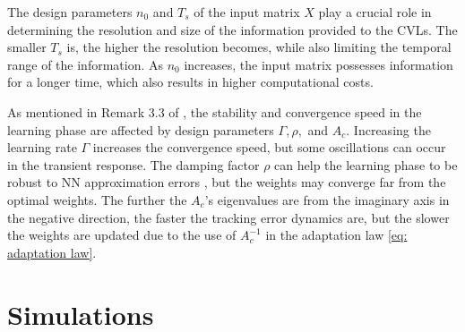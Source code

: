 \documentclass[letterpaper, 10 pt, conference]{ieeeconf}  %
\begin{document}
\begin{remark}
The design parameters $n_0$ and $T_s$ of the input matrix $X$ play a crucial role in determining the resolution and size of the information provided to the CVLs. The smaller $T_s$ is, the higher the resolution becomes, while also limiting the temporal range of the information.
As $n_0$ increases, the input matrix possesses information for a longer time, which also results in higher computational costs.
\label{remark:stack param}
\end{remark}

\begin{remark}
As mentioned in Remark 3.3 of \cite{BookEKcontrol}, the stability and convergence speed in the learning phase are affected by design parameters $\Gamma, \rho,$ and $A_c$. 
Increasing the learning rate $\Gamma$ increases the convergence speed, but some oscillations can occur in the transient response. 
The damping factor $\rho$ can help the learning phase to be robust to NN approximation errors \cite{BookSSGe}, but the weights may converge far from the optimal weights. 
The further the $A_c$'s eigenvalues are from the imaginary axis in the negative direction, the faster the tracking error dynamics are, but the slower the weights are updated due to the use of $A_c^{-1}$ in the adaptation law \eqref{eq: adaptation law}.
\label{remark:2}
\end{remark}

\section{Simulations} \label{sec: sim}
\end{document}
